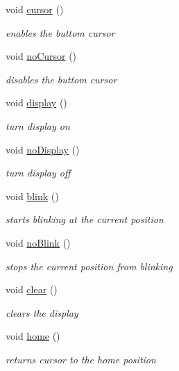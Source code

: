 \begin{DoxyCompactItemize}
void \hyperlink{class_l_c_d_a194814f64dfa50a90e07e0fe0d361620}{cursor} ()
\begin{DoxyCompactList}\small\item\em enables the buttom cursor \end{DoxyCompactList}\item 
void \hyperlink{class_l_c_d_aec8ffaa1e69c7a6e13ac0cfbc29151d9}{no\+Cursor} ()
\begin{DoxyCompactList}\small\item\em disables the buttom cursor \end{DoxyCompactList}\item 
void \hyperlink{class_l_c_d_a5b07cf05e8e5e7c53654f5ca0cf58b89}{display} ()
\begin{DoxyCompactList}\small\item\em turn display on \end{DoxyCompactList}\item 
void \hyperlink{class_l_c_d_af3974da6d988ba2d21c25135ada12108}{no\+Display} ()
\begin{DoxyCompactList}\small\item\em turn display off \end{DoxyCompactList}\item 
void \hyperlink{class_l_c_d_a878b36878fa8287093964eba83aace77}{blink} ()
\begin{DoxyCompactList}\small\item\em starts blinking at the current position \end{DoxyCompactList}\item 
void \hyperlink{class_l_c_d_a3b755c4b397b5985752be8c30ee1a9b5}{no\+Blink} ()
\begin{DoxyCompactList}\small\item\em stops the current position from blinking \end{DoxyCompactList}\item 
void \hyperlink{class_l_c_d_afa699e0beeeee03cce8cef87eba81c4a}{clear} ()
\begin{DoxyCompactList}\small\item\em clears the display \end{DoxyCompactList}\item 
void \hyperlink{class_l_c_d_aee45ad37f09312f5d9982257e2d37e68}{home} ()
\begin{DoxyCompactList}\small\item\em returns cursor to the home position \end{DoxyCompactList}\item 

\end{DoxyCompactItemize}
